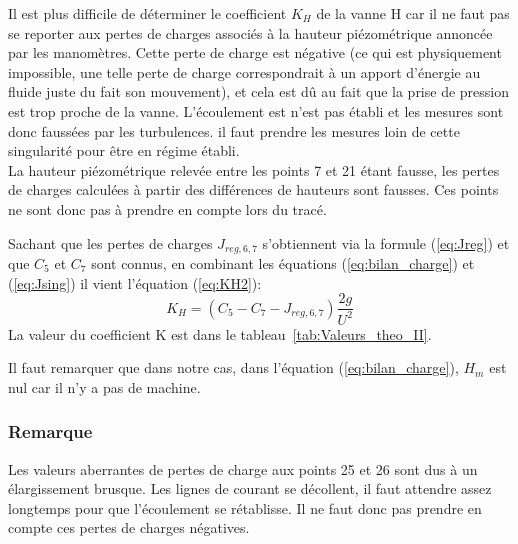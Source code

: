 \documentclass[12pt, a4paper, twoside]{article} %
\begin{document}
Il est plus difficile de déterminer le coefficient $K_{H}$ de la vanne H car il ne faut pas se reporter aux pertes de charges associés à la hauteur piézométrique annoncée par les manomètres. Cette perte de charge est négative (ce qui est physiquement impossible, une telle perte de charge correspondrait à un apport d'énergie au fluide juste du fait son mouvement), et cela est dû au fait que la prise de pression est trop proche de la vanne. L'écoulement est n'est pas établi et les mesures sont donc faussées par les turbulences. il faut prendre les mesures loin de cette singularité pour être en régime établi. \\
La hauteur piézométrique relevée entre les points 7 et 21 étant fausse, les pertes de charges calculées à partir des différences de hauteurs sont fausses. Ces points ne sont donc pas à prendre en compte lors du tracé.

Sachant que les pertes de charges $J_{reg,6,7}$ s'obtiennent via la formule (\ref{eq:Jreg}) et que $C_{5}$ et $C_{7}$ sont connus, en combinant les équations (\ref{eq:bilan_charge}) et (\ref{eq:Jsing}) il vient l'équation (\ref{eq:KH2}):
\begin{equation}
   K_{H}=(C_{5}-C_{7}-J_{reg,6,7})\frac{2g}{U^{2}}
    \label{eq:KH2}
\end{equation}
La valeur du coefficient K est dans le tableau~\ref{tab:Valeurs_theo_II}. 

Il faut remarquer que dans notre cas, dans l'équation (\ref{eq:bilan_charge}), $H_{m}$ est nul car il n'y a pas de machine.
\\
\subsubsection*{Remarque}
Les valeurs aberrantes de pertes de charge aux points 25 et 26 sont dus à un élargissement brusque. Les lignes de courant se décollent, il faut attendre assez longtemps pour que l'écoulement se rétablisse. Il ne faut donc pas prendre en compte ces pertes de charges négatives.
\end{document}
